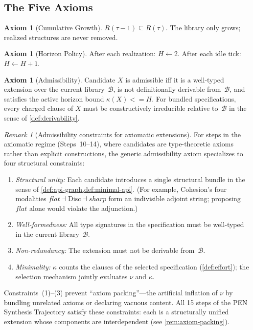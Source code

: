 \documentclass[11pt,a4paper]{article}
\def\leq{<=}%
\def\flat{flat}%
\def\sharp{sharp}%
\theoremstyle{plain}
\theoremstyle{definition}
\newtheorem{axiom}[theorem]{Axiom}
\theoremstyle{remark}
\newtheorem{remark}[theorem]{Remark}
\newcommand{\Disc}{\mathrm{Disc}}
\begin{document}
\subsection{The Five Axioms}

\begin{axiom}[Cumulative Growth]
\label{ax:cumulative}
$R(\tau - 1) \subseteq R(\tau)$.
The library only grows; realized structures are never removed.
\end{axiom}

\begin{axiom}[Horizon Policy]
\label{ax:horizon}
After each realization: $H \leftarrow 2$.
After each idle tick: $H \leftarrow H + 1$.
\end{axiom}

\begin{axiom}[Admissibility]
\label{ax:admissibility}
Candidate $X$ is admissible iff it is a well-typed extension over the current library~$\mathcal{B}$, is not definitionally derivable from~$\mathcal{B}$, and satisfies the active horizon bound $\kappa(X) \leq H$.
For bundled specifications, every charged clause of $X$ must be constructively irreducible relative to~$\mathcal{B}$ in the sense of \cref{def:derivability}.
\end{axiom}

\begin{remark}[Admissibility constraints for axiomatic extensions]
\label{rem:admissibility-constraints}
For steps in the axiomatic regime (Steps~10--14), where candidates are type-theoretic axioms rather than explicit constructions, the generic admissibility axiom specializes to four structural constraints:
\begin{enumerate}[nosep]
    \item \emph{Structural unity:} Each candidate introduces a single structural bundle in the sense of \cref{def:api-graph,def:minimal-api}.  (For example, Cohesion's four modalities $\flat \dashv \Disc \dashv \sharp$ form an indivisible adjoint string; proposing $\flat$ alone would violate the adjunction.)
    \item \emph{Well-formedness:} All type signatures in the specification must be well-typed in the current library~$\mathcal{B}$.
    \item \emph{Non-redundancy:} The extension must not be derivable from~$\mathcal{B}$.
    \item \emph{Minimality:} $\kappa$ counts the clauses of the selected specification (\cref{def:effort}); the selection mechanism jointly evaluates $\nu$ and $\kappa$.
\end{enumerate}
Constraints~(1)--(3) prevent ``axiom packing''---the artificial inflation of $\nu$ by bundling unrelated axioms or declaring vacuous content.  All 15 steps of the PEN Synthesis Trajectory satisfy these constraints: each is a structurally unified extension whose components are interdependent (see \cref{rem:axiom-packing}).
\end{remark}
\end{document}
